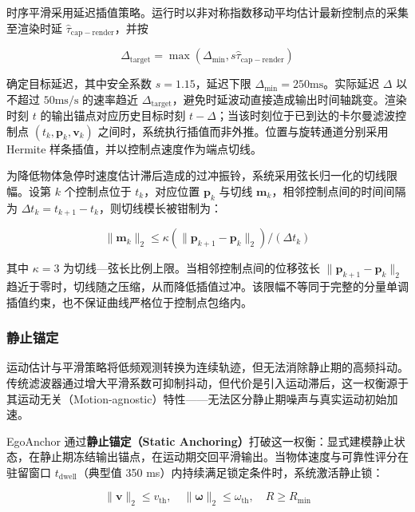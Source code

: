 \documentclass[9pt,twocolumn,letterpaper]{extarticle}
\begin{document}
时序平滑采用延迟插值策略。运行时以非对称指数移动平均估计最新控制点的采集至渲染时延 $\widehat{\tau}_{\mathrm{cap-render}}$，并按

\begin{equation}
\Delta_{\mathrm{target}} = \max\!\left(\Delta_{\mathrm{min}}, s \widehat{\tau}_{\mathrm{cap-render}}\right)
\label{eq:adaptive-delay}
\end{equation}


确定目标延迟，其中安全系数 $s = 1.15$，延迟下限 $\Delta_{\mathrm{min}} = 250 \mathrm{ms}$。实际延迟 $\Delta$ 以不超过 $50 \mathrm{ms}/\mathrm{s}$ 的速率趋近 $\Delta_{\mathrm{target}}$，避免时延波动直接造成输出时间轴跳变。渲染时刻 $t$ 的输出锚点对应历史目标时刻 $t - \Delta$；当该时刻位于已到达的卡尔曼滤波控制点 ${(t_k, \mathbf{p}_k, \mathbf{v}_k)}$ 之间时，系统执行插值而非外推。位置与旋转通道分别采用 Hermite 样条插值，并以控制点速度作为端点切线。

为降低物体急停时速度估计滞后造成的过冲振铃，系统采用弦长归一化的切线限幅。设第 $k$ 个控制点位于 $t_k$，对应位置 $\mathbf{p}_k$ 与切线 $\mathbf{m}_k$，相邻控制点间的时间间隔为 $\Delta t_k = t_{k+1} - t_k$，则切线模长被钳制为：

\begin{equation}
\lVert \mathbf{m}_k \rVert_2 \leq \kappa (\lVert \mathbf{p}_{k+1} - \mathbf{p}_k \rVert_2) / (\Delta t_k)
\label{eq:tangent-clamp}
\end{equation}


其中 $\kappa = 3$ 为切线---弦长比例上限。当相邻控制点间的位移弦长 $\lVert \mathbf{p}_{k+1} - \mathbf{p}_k \rVert_2$ 趋近于零时，切线随之压缩，从而降低插值过冲。该限幅不等同于完整的分量单调插值约束，也不保证曲线严格位于控制点包络内。

\subsubsection{静止锚定}\label{sec:staticlock}


运动估计与平滑策略将低频观测转换为连续轨迹，但无法消除静止期的高频抖动。传统滤波器通过增大平滑系数可抑制抖动，但代价是引入运动滞后，这一权衡源于其运动无关（Motion-agnostic）特性------无法区分静止期噪声与真实运动初始加速。

EgoAnchor 通过\textbf{静止锚定（Static Anchoring）}打破这一权衡：显式建模静止状态，在静止期冻结输出锚点，在运动期交回平滑输出。当物体速度与可靠性评分在驻留窗口 $t_{\mathrm{dwell}}$（典型值 350 ms）内持续满足锁定条件时，系统激活静止锁：

\begin{equation}
\lVert \mathbf{v} \rVert_2 \leq v_{\mathrm{th}}, \quad \lVert \mathbf{\omega} \rVert_2 \leq \omega_{\mathrm{th}}, \quad R \geq R_{\mathrm{min}}
\label{eq:lock-condition}
\end{equation}
\end{document}
